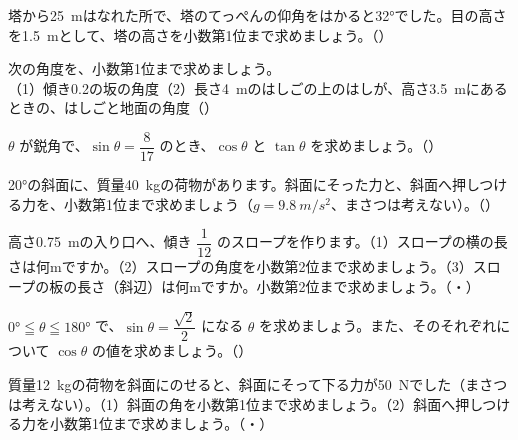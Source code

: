 \bkproblem 塔から\qty{25}{m}はなれた所で、塔のてっぺんの仰角をはかると\ang{32}でした。目の高さを\qty{1.5}{m}として、塔の高さを小数第1位まで求めましょう。\mbox{（）}

\bkproblem 次の角度を、小数第1位まで求めましょう。\\
（1）傾き0.2の坂の角度\qquad（2）長さ\qty{4}{m}のはしごの上のはしが、高さ\qty{3.5}{m}にあるときの、はしごと地面の角度\mbox{（）}

\bkproblem $\theta$ が鋭角で、$\sin\theta=\dfrac{8}{17}$ のとき、$\cos\theta$ と $\tan\theta$ を求めましょう。\mbox{（）}

\bkproblem \ang{20}の斜面に、質量\qty{40}{kg}の荷物があります。斜面にそった力と、斜面へ押しつける力を、小数第1位まで求めましょう（$g=\qty{9.8}{m/s^2}$、まさつは考えない）。\mbox{（）}


\bkproblem 高さ\qty{0.75}{m}の入り口へ、傾き $\dfrac{1}{12}$ のスロープを作ります。（1）\nobreak スロープの横の長さは何mですか。（2）\nobreak スロープの角度を小数第2位まで求めましょう。（3）\nobreak スロープの板の長さ（斜辺）は何mですか。小数第2位まで求めましょう。\mbox{（・）}

\bkproblem $\ang{0}\leqq\theta\leqq\ang{180}$ で、$\sin\theta=\dfrac{\sqrt2}{2}$ になる $\theta$ を求めましょう。また、そのそれぞれについて $\cos\theta$ の値を求めましょう。\mbox{（）}

\bkproblem 質量\qty{12}{kg}の荷物を斜面にのせると、斜面にそって下る力が\qty{50}{N}でした（まさつは考えない）。（1）\nobreak 斜面の角を小数第1位まで求めましょう。（2）\nobreak 斜面へ押しつける力を小数第1位まで求めましょう。\mbox{（・）}

